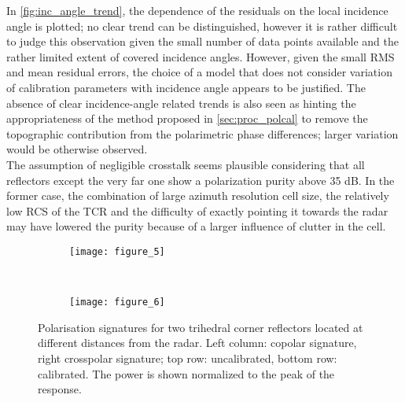 In \autoref{fig:inc_angle_trend}, the dependence of the residuals on the local incidence angle is plotted; no clear trend can be distinguished, however it is rather difficult to judge this observation given the small number of data points available and the rather limited extent of covered incidence angles. However, given the small RMS and mean residual errors, the choice of a model that does not consider variation of calibration parameters with incidence angle appears to be justified. The absence of clear incidence-angle related trends is also seen as hinting the appropriateness of the method proposed in \autoref{sec:proc_polcal} to remove the topographic contribution from the polarimetric phase differences; larger variation would be otherwise observed.\\
The assumption of negligible crosstalk seems plausible considering that all reflectors  except the very far one show a polarization purity above 35 dB. In the former case, the combination of large azimuth resolution cell size, the relatively low RCS of the TCR and  the difficulty of exactly pointing it towards the radar may have lowered the purity because of a larger influence of clutter in the cell.

\begin{figure*}[hb]
	\centering
	\begin{subfigure}[t]{\textwidth}
	\centering
	\texttt{[image: figure\_5]}
	\label{fig:signatures:near}
	\end{subfigure}\\
	\begin{subfigure}[t]{\textwidth}
	\centering
	\texttt{[image: figure\_6]}
	\label{fig:signatures:far}
	\end{subfigure}
	\caption{Polarisation signatures for two trihedral corner reflectors located at different distances from the radar. Left column: copolar signature, right crosspolar signature; top row: uncalibrated, bottom row: calibrated. The power is shown normalized to the peak of the response.}
	\label{fig:signatures}
\end{figure*}


